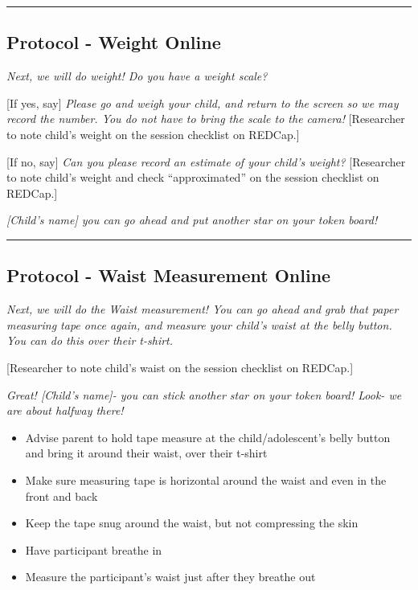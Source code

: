 \documentclass[]{book}
\begin{document}
\begin{center}\rule{0.5\linewidth}{0.5pt}\end{center}

\hypertarget{protocol---weight-online-1}{%
\subsection{Protocol - Weight Online}\label{protocol---weight-online-1}}

\emph{Next, we will do weight! Do you have a weight scale?}

{[}If yes, say{]} \emph{Please go and weigh your child, and return to the screen so we may record the number. You do not have to bring the scale to the camera!} {[}Researcher to note child's weight on the session checklist on REDCap.{]}

{[}If no, say{]} \emph{Can you please record an estimate of your child's weight?} {[}Researcher to note child's weight and check ``approximated'' on the session checklist on REDCap.{]}

\emph{{[}Child's name{]} you can go ahead and put another star on your token board!}

\begin{center}\rule{0.5\linewidth}{0.5pt}\end{center}

\hypertarget{protocol---waist-measurement-online-1}{%
\subsection{Protocol - Waist Measurement Online}\label{protocol---waist-measurement-online-1}}

\emph{Next, we will do the Waist measurement! You can go ahead and grab that paper measuring tape once again, and measure your child's waist at the belly button. You can do this over their t-shirt.}

{[}Researcher to note child's waist on the session checklist on REDCap.{]}

\emph{Great! {[}Child's name{]}- you can stick another star on your token board! Look- we are about halfway there!}

\begin{itemize}
\item
  Advise parent to hold tape measure at the child/adolescent's belly button and bring it around their waist, over their t-shirt
\item
  Make sure measuring tape is horizontal around the waist and even in the front and back
\item
  Keep the tape snug around the waist, but not compressing the skin
\item
  Have participant breathe in
\item
  Measure the participant's waist just after they breathe out
\end{itemize}
\end{document}
